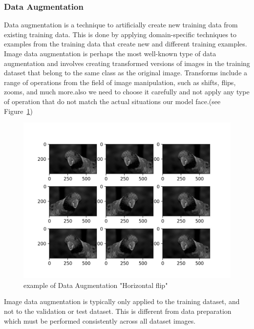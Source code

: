 \subsubsection{Data Augmentation}
Data augmentation is a technique to artificially create new training data from existing training data. This is done by applying domain-specific techniques to examples from the training data that create new and different training examples.\newline
Image data augmentation is perhaps the most well-known type of data augmentation and involves creating transformed versions of images in the training dataset that belong to the same class as the original image.\newline
Transforms include a range of operations from the field of image manipulation, such as shifts, flips, zooms, and much more.also we need to choose it carefully and not apply any type of operation that do not match the actual situations our model face.(see Figure~\ref{fig:data_augmentation})
\begin{figure}
	\centering
	\includegraphics[width=1\textwidth]{images/data_aug.jpg}
	\caption{example of Data Augmentation "Horizontal flip"}
	\label{fig:data_augmentation}
\end{figure} 
\newline
Image data augmentation is typically only applied to the training dataset, and not to the validation or test dataset. This is different from data preparation which must be performed consistently across all dataset images.




